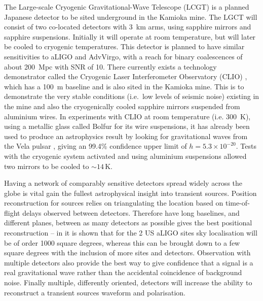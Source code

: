 \documentclass{article}
\begin{document}
The Large-scale Cryogenic Gravitational-Wave Telescope (LCGT)
\cite{Miyoki:2005, Ohashi:2008} is a planned Japanese detector to be sited
underground in the Kamioka mine. The LGCT will consist of two co-located
detectors with 3~km arms, using sapphire mirrors and sapphire
suspensions. Initially it will operate at room temperature, but will later be
cooled to cryogenic temperatures. This detector is planned to have similar sensitivities to aLIGO
and AdvVirgo, with a reach for binary coalescences of about 200~Mpc with SNR of
10. There currently exists a technology demonstrator called the Cryogenic Laser
Interferometer Observatory (CLIO) \cite{Yamamoto:2008, CLIOweb}, which has a
100~m baseline and is also sited in the Kamioka mine. This is to demonstrate the
very stable conditions (i.e.\ low levels of seismic noise) existing in the mine
and also the cryogenically cooled sapphire mirrors suspended from aluminium
wires. In experiments with CLIO at room temperature (i.e. 300~K), using a metallic glass 
called Bolfur for its wire suspensions, it has already been used to produce an astrophysics result by
looking for gravitational waves from the Vela pulsar \cite{Akutsu:2008}, giving
an 99.4\% confidence upper limit of $h = 5.3\times10^{-20}$. Tests with the
cryogenic system activated and using aluminium suspensions allowed two mirrors to be cooled to
$\sim14$\,K.

Having a network of comparably sensitive detectors spread widely across the globe 
is vital gain the fullest astrophysical insight into transient sources. Position
reconstruction for sources relies on triangulating the location based on time-of-flight
delays observed between detectors. Therefore have long baselines, and different planes,
between as many detectors as possible gives the best positional reconstruction -- in 
\cite{Fairhurst:2010} it is shown that for the 2 US aLIGO sites sky localisation will
be of order 1000 square degrees, whereas this can be brought down to a few square degrees
with the inclusion of more sites and detectors. 
Observation with multiple detectors also provide the best way to give confidence that a
signal is a real gravitational wave rather than the accidental coincidence of 
background noise. Finally multiple, differently oriented, detectors will increase the
ability to reconstruct a transient sources waveform and polarisation. 
\end{document}
